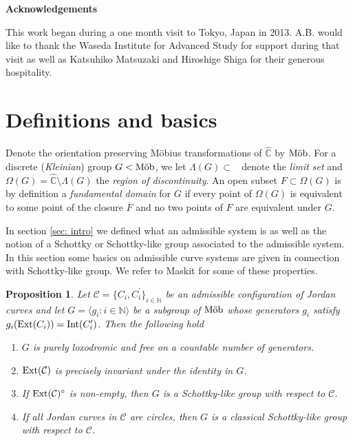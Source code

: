 \documentclass[12pt]{amsart}
\theoremstyle{plain}
\newtheorem{prop}[thm]{Proposition}
\DeclareMathOperator{\Mob}{\mbox{\rm{M\"ob}}}
\DeclareMathOperator{\Int}{\rm Int}
\DeclareMathOperator{\Ext}{\rm Ext}
\DeclareMathOperator{\Chat}{\widehat{\mathbb{C}}}
\begin{document}
\centerline{\bf Acknowledgements}  This work began  during a one month visit to Tokyo, Japan in 2013. A.B. would like to thank  the Waseda Institute for Advanced Study  for  support during that visit as well as Katsuhiko Matsuzaki and Hiroshige Shiga for their generous hospitality. 


\section{Definitions and basics} \label{sec: definitions and basics}
Denote the orientation preserving M\"obius transformations of 
$\widehat{\mathbb{C}}$ by $\Mob$. 
For a discrete ({\it Kleinian}) group $G < \Mob$, we let 
$\Lambda(G) \subset \Chat$ denote the {\it limit set} and 
$\Omega(G)=\widehat{\mathbb C}\setminus \Lambda(G)$ the {\it region of discontinuity}.
An open subset $F \subset \Omega(G)$ is by definition 
a {\it fundamental domain} for $G$ if every point of 
$\Omega(G)$ is equivalent to some point of the closure
$\overline F$ and no two points of $F$ are equivalent under $G$. 



In section \ref{sec: intro} we defined what an admissible system is as well as the notion of a  Schottky or  Schottky-like group associated to the  admissible  system. 
In this section some basics on admissible curve systems are given
in connection with Schottky-like group. We  refer to Maskit \cite[Sect.VIII.A]{M}
for some of these properties.

\begin{prop}\label{prop: basics0}
Let $\mathcal{C}=\{C_i ,C_i ^{\prime}\}_{i \in \mathbb N}$ be an 
admissible configuration of Jordan curves and let $G =\langle g_i :i \in \mathbb N\rangle$
be a subgroup of $\Mob$ whose generators $g_i$ satisfy $g_i(\Ext(C_i))=\Int( C_i^{\prime})$. 
Then the following hold
\begin{enumerate}

\item $G$ is purely loxodromic and free on a countable number of generators.

\item $\Ext (\mathcal{C})$ is precisely invariant under the identity in $G$.

\item If $\Ext (\mathcal{C})^{\circ}$ is non-empty, then $G$ is a Schottky-like group
with respect to $\mathcal C$.

\item If all Jordan curves in $\mathcal C$ are circles, then $G$ is a classical
Schottky-like group
with respect to $\mathcal C$.
\end{enumerate}
\end{prop}
\end{document}
